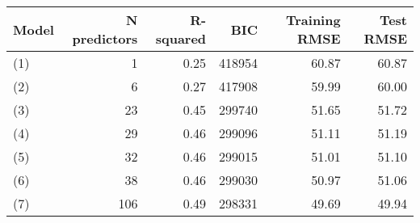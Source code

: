 \begin{tabular}{lrrrrr}
  \toprule
Model & N predictors & R-squared & BIC & Training RMSE & Test RMSE \\ 
  \midrule
(1) & 1 & 0.25 & 418954 & 60.87 & 60.87 \\ 
  (2) & 6 & 0.27 & 417908 & 59.99 & 60.00 \\ 
  (3) & 23 & 0.45 & 299740 & 51.65 & 51.72 \\ 
  (4) & 29 & 0.46 & 299096 & 51.11 & 51.19 \\ 
  (5) & 32 & 0.46 & 299015 & 51.01 & 51.10 \\ 
  (6) & 38 & 0.46 & 299030 & 50.97 & 51.06 \\ 
  (7) & 106 & 0.49 & 298331 & 49.69 & 49.94 \\ 
   \bottomrule
\end{tabular}
